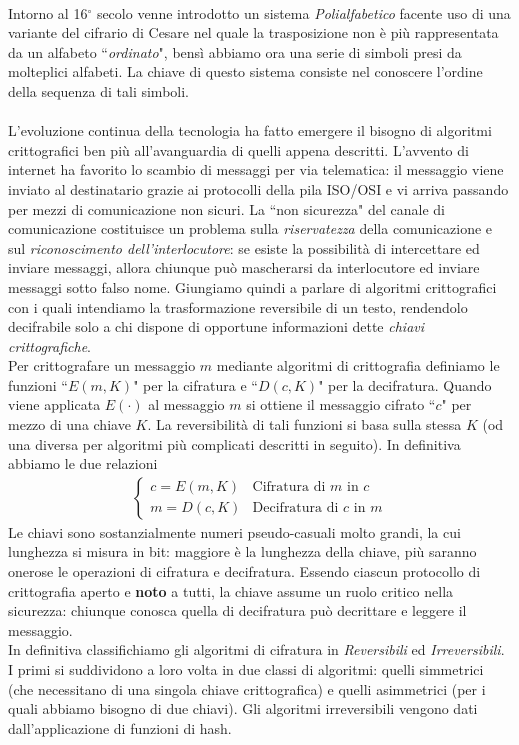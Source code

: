 \documentclass[a4paper,12pt]{tesiinfo}
\begin{document}
\\
Intorno al 16$^\circ$ secolo venne introdotto un sistema \textit{Polialfabetico} facente uso di una variante del cifrario di Cesare nel quale la trasposizione non \`e pi\`u rappresentata da un alfabeto ``\textit{ordinato}", bens\`i abbiamo ora una serie di simboli presi da molteplici alfabeti. La chiave di questo sistema consiste nel conoscere l'ordine della sequenza di tali simboli.
\\
\\
L'evoluzione continua della tecnologia ha fatto emergere il bisogno di algoritmi crittografici ben pi\`u all'avanguardia di quelli appena descritti. L'avvento di internet ha favorito lo scambio di messaggi per via telematica: il messaggio viene inviato al destinatario grazie ai protocolli della pila ISO/OSI e vi arriva passando per mezzi di comunicazione non sicuri. La ``non sicurezza" del canale di comunicazione costituisce un problema sulla \textit{riservatezza} della comunicazione e sul \textit{riconoscimento dell'interlocutore}: se esiste la possibilit\`a di intercettare ed inviare messaggi, allora chiunque pu\`o mascherarsi da interlocutore ed inviare messaggi sotto falso nome. Giungiamo quindi a parlare di algoritmi crittografici con i quali intendiamo la trasformazione reversibile di un testo, rendendolo decifrabile solo a chi dispone di opportune informazioni dette \textit{chiavi crittografiche}. 
\\
Per crittografare un messaggio $m$ mediante algoritmi di crittografia definiamo le funzioni ``$E(m,K)$" per la cifratura e ``$D(c, K)$" per la decifratura. Quando viene applicata $E(\cdot )$ al messaggio $m$ si ottiene il messaggio cifrato ``$c$" per mezzo di una chiave $K$. La reversibilit\`a di tali funzioni si basa sulla stessa $K$ (od una diversa per algoritmi pi\`u complicati descritti in seguito). In definitiva abbiamo le due relazioni 
\begin{align*}
    \begin{cases}
     c= E(m, K)  &\text{Cifratura di $m$ in $c$}\\
     m= D(c, K)  &\text{Decifratura di $c$ in $m$}
    \end{cases}
\end{align*}
Le chiavi sono sostanzialmente numeri pseudo-casuali molto grandi, la cui lunghezza si misura in bit: maggiore \`e la lunghezza della chiave, pi\`u saranno onerose le operazioni di cifratura e decifratura. Essendo ciascun protocollo di crittografia aperto e \textbf{noto} a tutti, la chiave assume un ruolo critico nella sicurezza: chiunque conosca quella di decifratura pu\`o decrittare e leggere il messaggio.
\\
In definitiva classifichiamo gli algoritmi di cifratura in \textit{Reversibili} ed \textit{Irreversibili}. I primi si suddividono a loro volta in due classi di algoritmi: quelli simmetrici (che necessitano di una singola chiave crittografica) e quelli asimmetrici (per i quali abbiamo bisogno di due chiavi). Gli algoritmi irreversibili vengono dati dall'applicazione di funzioni di hash.
%
%
%
\end{document}
